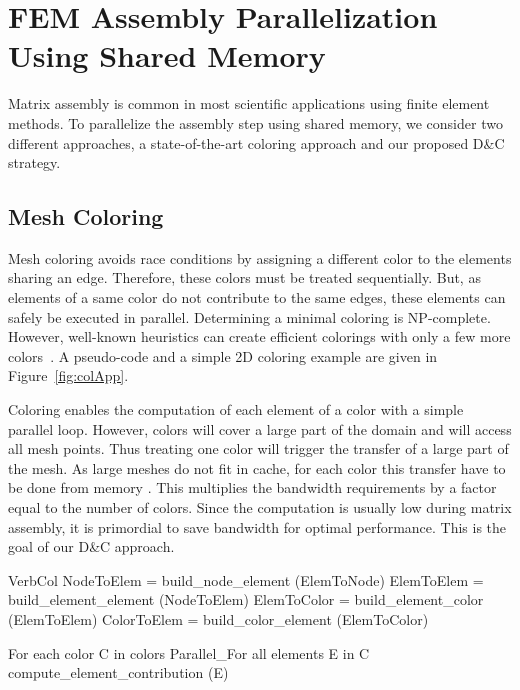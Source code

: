 \documentclass[10pt]{IOS-Book-Article}
\begin{document}
\section{FEM Assembly Parallelization Using Shared Memory}
\label{sec:assembly}

Matrix assembly is common in most scientific applications using finite element methods. 
To parallelize the assembly step using shared memory, we consider two different approaches, a state-of-the-art coloring approach and our
proposed D\&C strategy.


\subsection{Mesh Coloring}
\label{sec:col}
Mesh coloring avoids race conditions by assigning a different color to the elements sharing an edge. Therefore, these colors must be treated sequentially. But, as elements of a same color do not contribute to the same edges, these elements can safely be executed in parallel.
Determining a minimal coloring is NP-complete. However, well-known heuristics can create efficient colorings
with only a few more colors~\cite{CPUfe}. A pseudo-code and a simple 2D coloring example are given in Figure~\ref{fig:colApp}.

Coloring enables the computation of each element of a color with a simple parallel loop.
However, colors will cover a large part of the domain and will access all mesh 
points. Thus treating one color will trigger the transfer of a large part
of the mesh. As large meshes do not fit in cache, for each color this transfer
have to be done from memory . This multiplies the bandwidth requirements by
a factor equal to the number of colors. Since the computation is
usually low during matrix assembly, it is primordial to save bandwidth for optimal performance. This is the goal of our D\&C approach.



\begin{SaveVerbatim}[]{VerbCol}
NodeToElem = build_node_element (ElemToNode)
ElemToElem = build_element_element (NodeToElem)
ElemToColor = build_element_color (ElemToElem)
ColorToElem = build_color_element (ElemToColor)

For each color C in colors
  Parallel_For all elements E in C
    compute_element_contribution (E)
\end{SaveVerbatim}
\end{document}
